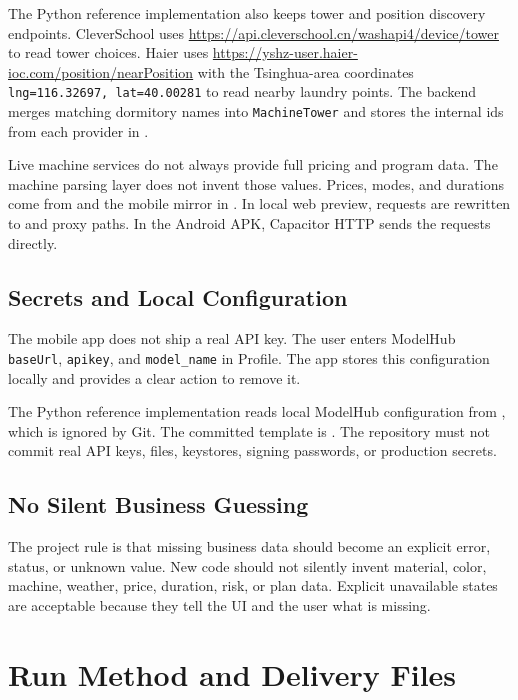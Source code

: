 \documentclass[11pt,a4paper]{article}
\begin{document}
The Python reference implementation also keeps tower and position discovery endpoints. CleverSchool uses \url{https://api.cleverschool.cn/washapi4/device/tower} to read tower choices. Haier uses \url{https://yshz-user.haier-ioc.com/position/nearPosition} with the Tsinghua-area coordinates \texttt{lng=116.32697, lat=40.00281} to read nearby laundry points. The backend merges matching dormitory names into \texttt{MachineTower} and stores the internal ids from each provider in .

Live machine services do not always provide full pricing and program data. The machine parsing layer does not invent those values. Prices, modes, and durations come from  and the mobile mirror in . In local web preview, requests are rewritten to  and  proxy paths. In the Android APK, Capacitor HTTP sends the requests directly.

\subsection{Secrets and Local Configuration}

The mobile app does not ship a real API key. The user enters ModelHub \texttt{baseUrl}, \texttt{apikey}, and \texttt{model\_name} in Profile. The app stores this configuration locally and provides a clear action to remove it.

The Python reference implementation reads local ModelHub configuration from , which is ignored by Git. The committed template is . The repository must not commit real API keys,  files, keystores, signing passwords, or production secrets.

\subsection{No Silent Business Guessing}

The project rule is that missing business data should become an explicit error, status, or unknown value. New code should not silently invent material, color, machine, weather, price, duration, risk, or plan data. Explicit unavailable states are acceptable because they tell the UI and the user what is missing.

\section{Run Method and Delivery Files}
\end{document}
